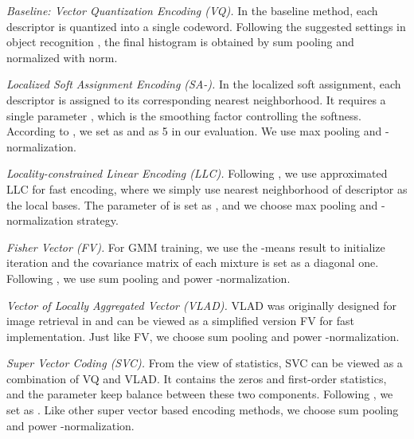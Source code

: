 \documentclass[twocolumn]{svjour3}          \smartqed  \usepackage{slashbox}
\begin{document}
\emph{Baseline: Vector Quantization Encoding (VQ).} In the baseline method, each descriptor is quantized into a single codeword. Following the suggested settings in object recognition \cite{ZhangMLS07}, the final histogram is obtained by sum pooling and normalized with  norm.

\emph{Localized Soft Assignment Encoding (SA-).} In the localized soft assignment, each descriptor is assigned to its corresponding  nearest neighborhood. It requires a single parameter , which is the smoothing factor controlling the softness. According to \cite{LiuWL11}, we set  as  and  as 5 in our evaluation. We use max pooling and -normalization.

\emph{Locality-constrained Linear Encoding (LLC).} Following \cite{WangYYLHG10}, we use approximated LLC for fast encoding, where we simply use  nearest neighborhood of descriptor as the local bases. The parameter of  is set as , and we choose max pooling and -normalization strategy.

\emph{Fisher Vector (FV).} For GMM training, we use the -means result to initialize iteration and the covariance matrix of each mixture is set as a diagonal one. Following \cite{PerronninSM10}, we use sum pooling and power -normalization.

\emph{Vector of Locally Aggregated Vector (VLAD).} VLAD was originally designed for image retrieval in \cite{JegouPDSPS12} and can be viewed as a simplified version FV for fast implementation. Just like FV, we choose sum pooling and power -normalization.

\emph{Super Vector Coding (SVC).} From the view of statistics, SVC can be viewed as a combination of VQ and VLAD. It contains the zeros and first-order statistics, and the parameter  keep balance between these two components. Following \cite{ZhouYZH10}, we set  as . Like other super vector based encoding methods, we choose sum pooling and power -normalization.
\end{document}
